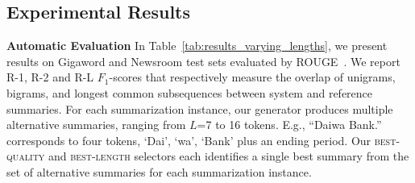 \documentclass[11pt]{article}
\begin{document}
\subsection{Experimental Results}
\label{sec:results}

\noindent\textbf{Automatic Evaluation}\quad\quad
In Table~\ref{tab:results_varying_lengths}, we present results on Gigaword and Newsroom test sets evaluated by ROUGE~\cite{lin-2004-rouge}.
We report R-1, R-2 and R-L $F_1$-scores that respectively measure the overlap of unigrams, bigrams, and longest common subsequences between system and reference summaries.
For each summarization instance, our generator produces multiple alternative summaries, ranging from $L$=7 to 16 tokens.
E.g., ``Daiwa Bank.'' corresponds to four tokens, `Dai', `wa', `Bank' plus an ending period.
Our \textsc{best-quality} and \textsc{best-length} selectors each identifies a single best summary from the set of alternative summaries for each summarization instance.
\end{document}
